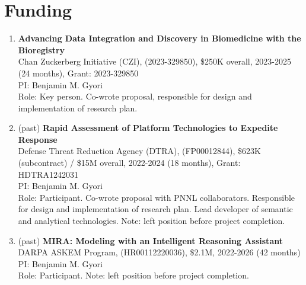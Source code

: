 \documentclass[10pt,a4paper,sans]{moderncv} %
\begin{document}
\section{Funding}
    \begin{enumerate}
    \itemsep0.75em
    \item  \textbf{Advancing Data Integration and Discovery in Biomedicine with the Bioregistry}\\
        Chan Zuckerberg Initiative (CZI), (2023-329850), \$250K overall, 2023-2025 (24 months), Grant: 2023-329850\\
        PI: Benjamin M. Gyori\\
        Role: Key person. Co-wrote proposal, responsible for design and implementation of research plan.
    \item (past) \textbf{Rapid Assessment of Platform Technologies to Expedite Response}\\
        Defense Threat Reduction Agency (DTRA), (FP00012844), \$623K (subcontract) / \$15M overall, 2022-2024 (18 months), Grant: HDTRA1242031\\
        PI: Benjamin M. Gyori\\
        Role: Participant. Co-wrote proposal with PNNL collaborators. 
Responsible for design and implementation of research plan. 
Lead developer of semantic and analytical technologies.
Note: left position before project completion.

    \item (past) \textbf{MIRA: Modeling with an Intelligent Reasoning Assistant}\\
        DARPA ASKEM Program, (HR00112220036), \$2.1M, 2022-2026 (42 months)\\
        PI: Benjamin M. Gyori\\
        Role: Participant. 
Note: left position before project completion.


\end{enumerate}
\end{document}

